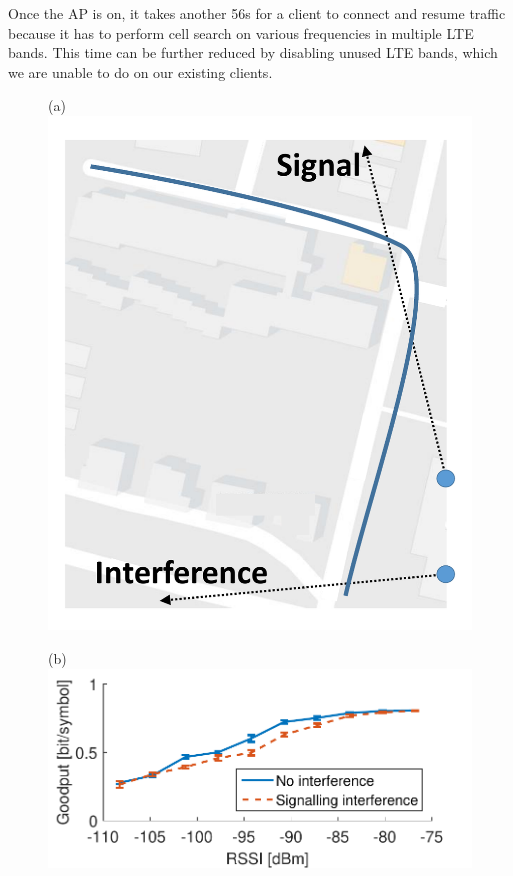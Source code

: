 Once the AP is on, it takes another 56s for a client to connect and resume traffic because it has to perform cell search on various frequencies in multiple LTE bands. This time can be further reduced by disabling unused LTE bands, which we are unable to do on our existing clients. 

\begin{figure}[htb!]
  \hfill
  \begin{minipage}{0.15\textwidth}
    \centering
    (a)
    \includegraphics[width=\textwidth]{./figs/outdoor.pdf}
  \end{minipage}
  \hspace{12pt}
  \begin{minipage}{0.4\textwidth}
    \centering
    (b)
    \includegraphics[width=\textwidth]{./figs/sig_vs_no.pdf}

\end{minipage}
\end{figure}
